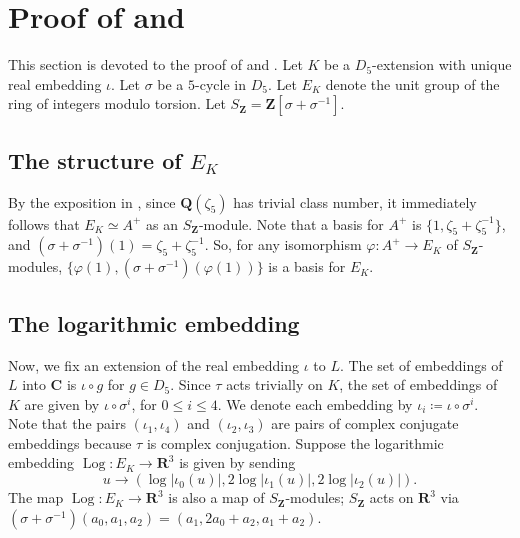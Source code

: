 \documentclass{amsart}
\newcommand{\QQ}{\mathbf{Q}}
\newcommand{\ZZ}{\mathbf{Z}}
\newcommand{\RR}{\mathbf{R}}
\newcommand{\CC}{\mathbf{C}}
\DeclareMathOperator{\Log}{Log}
\numberwithin{equation}{section}
\begin{document}

\section{Proof of  and }
This section is devoted to the proof of  and . Let $K$ be a $D_5$-extension with unique real embedding $\iota$. Let $\sigma$ be a $5$-cycle in $D_5$. Let $E_K$ denote the unit group of the ring of integers modulo torsion. Let $S_{\ZZ} = \ZZ[\sigma + \sigma^{-1}]$. 

\subsection{The structure of $E_K$}
By the exposition in , since $\QQ(\zeta_5)$ has trivial class number, it immediately follows that $E_K \simeq A^+$ as an $S_{\ZZ}$-module. Note that a basis for $A^+$ is $\{1, \zeta_5 + \zeta_5^{-1}\}$, and $(\sigma + \sigma^{-1})(1) = \zeta_5 + \zeta_5^{-1}$. So, for any isomorphism $\varphi \colon A^+ \rightarrow E_K$ of $S_{\ZZ}$-modules, $\{\varphi(1), (\sigma + \sigma^{-1})(\varphi(1))\}$ is a basis for $E_K$.

\subsection{The logarithmic embedding}
Now, we fix an extension of the real embedding $\iota$ to $L$. The set of embeddings of $L$ into $\CC$ is $\iota\circ g$ for $g\in D_5$. Since $\tau$ acts trivially on $K$, the set of embeddings of $K$ are given by $\iota \circ \sigma^i$, for $0\leq i \leq 4$. We denote each embedding by $\iota_i \coloneqq \iota \circ \sigma^i$. Note that the pairs $(\iota_1, \iota_4)$ and $(\iota_2, \iota_3)$ are pairs of complex conjugate embeddings because $\tau$ is complex conjugation. Suppose the logarithmic embedding $\Log \colon E_K \rightarrow \RR^3$ is given by sending 
\[
    u \rightarrow (\log |\iota_0(u)|, 2\log |\iota_1(u)|, 2 \log |\iota_2(u)|).
\]
The map $\Log \colon E_K \rightarrow \RR^3$ is also a map of $S_{\ZZ}$-modules; $S_{\ZZ}$ acts on $\RR^3$ via $(\sigma + \sigma^{-1})(a_0, a_1, a_2) = (a_1, 2a_0 + a_2, a_1 + a_2)$.
\end{document}
